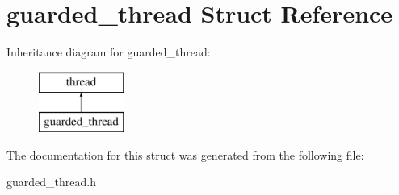 \hypertarget{structguarded__thread}{}\section{guarded\+\_\+thread Struct Reference}
\label{structguarded__thread}
Inheritance diagram for guarded\+\_\+thread\+:\begin{figure}[H]
\begin{center}
\leavevmode
\includegraphics[height=2.000000cm]{structguarded__thread}
\end{center}
\end{figure}


The documentation for this struct was generated from the following file\+:\begin{DoxyCompactItemize}
\item 
guarded\+\_\+thread.\+h\end{DoxyCompactItemize}
